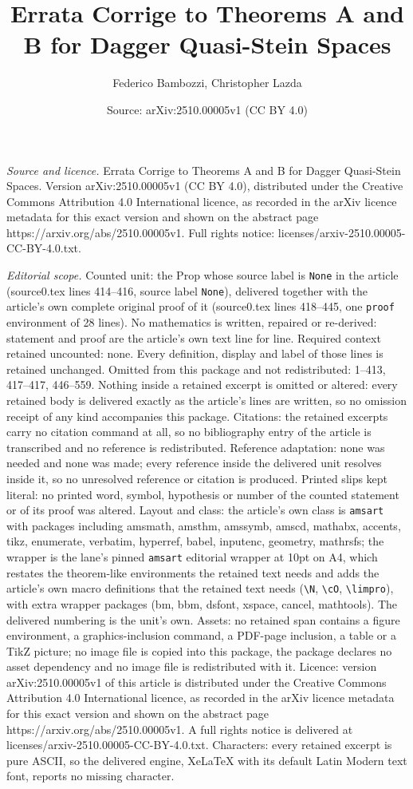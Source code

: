 \documentclass[10pt,a4paper]{amsart}
\title[Errata Corrige to Theorems A and B for Dagger Quasi-Stein Sp]{Errata Corrige to Theorems A and B for Dagger Quasi-Stein Spaces}
\author{Federico Bambozzi, Christopher Lazda}
\date{Source: arXiv:2510.00005v1 (CC BY 4.0)}
\begin{document}
\maketitle

\noindent\emph{Source and licence.} Errata Corrige to Theorems A and B for Dagger Quasi-Stein Spaces. Version arXiv:2510.00005v1 (CC BY 4.0), distributed under the Creative Commons Attribution 4.0 International licence, as recorded in the arXiv licence metadata for this exact version and shown on the abstract page https://arxiv.org/abs/2510.00005v1. Full rights notice: licenses/arxiv-2510.00005-CC-BY-4.0.txt.\par\smallskip

\noindent\textit{Editorial scope.} Counted unit: the Prop whose source label is \texttt{None} in the article (source0.tex lines 414--416, source label \texttt{None}), delivered together with the article's own complete original proof of it (source0.tex lines 418--445, one \texttt{proof} environment of 28 lines). No mathematics is written, repaired or re-derived: statement and proof are the article's own text line for line. Required context retained uncounted: none. Every definition, display and label of those lines is retained unchanged. Omitted from this package and not redistributed: 1--413, 417--417, 446--559. Nothing inside a retained excerpt is omitted or altered: every retained body is delivered exactly as the article's lines are written, so no omission receipt of any kind accompanies this package. Citations: the retained excerpts carry no citation command at all, so no bibliography entry of the article is transcribed and no reference is redistributed. Reference adaptation: none was needed and none was made; every reference inside the delivered unit resolves inside it, so no unresolved reference or citation is produced. Printed slips kept literal: no printed word, symbol, hypothesis or number of the counted statement or of its proof was altered. Layout and class: the article's own class is \texttt{amsart} with packages including amsmath, amsthm, amssymb, amscd, mathabx, accents, tikz, enumerate, verbatim, hyperref, babel, inputenc, geometry, mathrsfs; the wrapper is the lane's pinned \texttt{amsart} editorial wrapper at 10pt on A4, which restates the theorem-like environments the retained text needs and adds the article's own macro definitions that the retained text needs (\texttt{\textbackslash N}, \texttt{\textbackslash cO}, \texttt{\textbackslash limpro}), with extra wrapper packages (bm, bbm, dsfont, xspace, cancel, mathtools). The delivered numbering is the unit's own. Assets: no retained span contains a figure environment, a graphics-inclusion command, a PDF-page inclusion, a table or a TikZ picture; no image file is copied into this package, the package declares no asset dependency and no image file is redistributed with it. Licence: version arXiv:2510.00005v1 of this article is distributed under the Creative Commons Attribution 4.0 International licence, as recorded in the arXiv licence metadata for this exact version and shown on the abstract page https://arxiv.org/abs/2510.00005v1. A full rights notice is delivered at licenses/arxiv-2510.00005-CC-BY-4.0.txt. Characters: every retained excerpt is pure ASCII, so the delivered engine, XeLaTeX with its default Latin Modern text font, reports no missing character.
\end{document}
